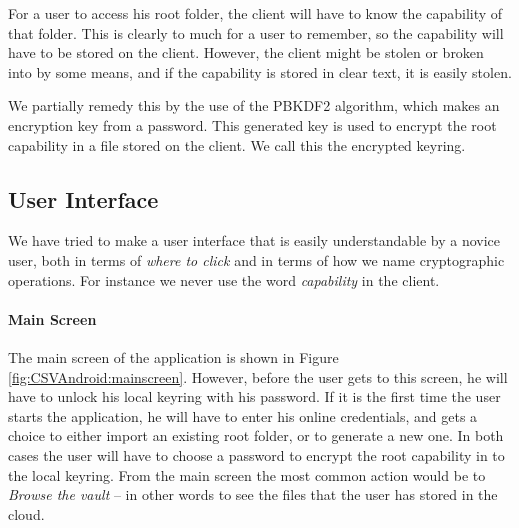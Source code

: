 \documentclass[pdftex,english,10pt,b5paper,twoside]{book}
\begin{document}
For a user to access his root folder, the client will have to know the
capability of that folder. This is clearly to much for a user to remember, so
the capability will have to be stored on the client. However, the client might
be stolen or broken into by some means, and if the capability is stored in
clear text, it is easily stolen.

We partially remedy this by the use of the \ac{PBKDF2} algorithm, which makes
an encryption key from a password. This generated key is used to encrypt the
root capability in a file stored on the client. We call this the encrypted
keyring.

\subsection{User Interface}

We have tried to make a user interface that is easily understandable by a
novice user, both in terms of \emph{where to click} and in terms of how we name
cryptographic operations. For instance we never use the word \emph{capability}
in the client.

\paragraph{Main Screen}

The main screen of the application is shown in Figure
\ref{fig:CSVAndroid:mainscreen}. However, before the user gets to this screen,
he will have to unlock his local keyring with his password. If it is the first
time the user starts the application, he will have to enter his online
credentials, and gets a choice to either import an existing root folder, or to
generate a new one. In both cases the user will have to choose a password to
encrypt the root capability in to the local keyring. From the main screen the
most common action would be to \emph{Browse the vault} -- in other words to see
the files that the user has stored in the cloud.
\end{document}
